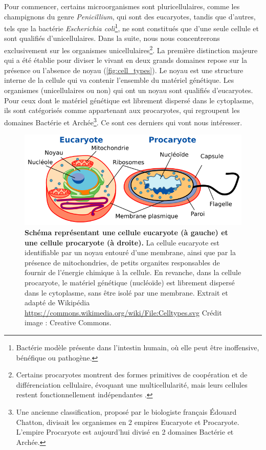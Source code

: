 Pour commencer, certains microorganismes sont pluricellulaires, comme les champignons du genre \textit{Penicillium}, qui sont des eucaryotes, tandis que d'autres, tels que la bactérie \textit{Escherichia coli}\footnote{Bactérie modèle présente dans l’intestin humain, où elle peut être inoffensive, bénéfique ou pathogène.}, ne sont constitués que d'une seule cellule et sont qualifiés d'unicellulaires. Dans la suite, nous nous concentrerons exclusivement sur les organismes unicellulaires\footnote{Certains procaryotes montrent des formes primitives de coopération et de différenciation cellulaire, évoquant une multicellularité, mais leurs cellules restent fonctionnellement indépendantes \cite{wilpiszeski_soil_2019}.}. 
La première distinction majeure qui a été établie pour diviser le vivant en deux grands domaines repose sur la présence ou l'absence de noyau (\autoref{fig:cell_types}). Le noyau est une structure interne de la cellule qui va contenir l'ensemble du matériel génétique. Les organismes (unicellulaires ou non) qui ont un noyau sont qualifiés d'eucaryotes. Pour ceux dont le matériel génétique est librement dispersé dans le cytoplasme, ils sont catégorisés comme appartenant aux procaryotes, qui regroupent les domaines Bactérie et Archée\footnote{Une ancienne classification, proposé par le biologiste français Édouard Chatton, divisait les organismes en 2 empires Eucaryote et Procaryote. L'empire Procaryote est aujourd'hui divisé en 2 domaines Bactérie et Archée.}. Ce sont ces derniers qui vont nous intéresser.
\begin{figure}[htbp]
    \centering
    \includegraphics[width=0.8\linewidth]{images/CelltypesFr.png}
    \caption[Schéma cellules eucaryotes et procaryotes]{\textbf{Schéma représentant une cellule eucaryote (à gauche) et une cellule procaryote (à droite).} La cellule eucaryote est identifiable par un noyau entouré d'une membrane, ainsi que par la présence de mitochondries, de petits organites responsables de fournir de l'énergie chimique à la cellule. En revanche, dans la cellule procaryote, le matériel génétique (nucléoïde) est librement dispersé dans le cytoplasme, sans être isolé par une membrane. Extrait et adapté de Wikipédia \url{https://commons.wikimedia.org/wiki/File:Celltypes.svg} Crédit image : Creative Commons.}
    \label{fig:cell_types}
\end{figure}

